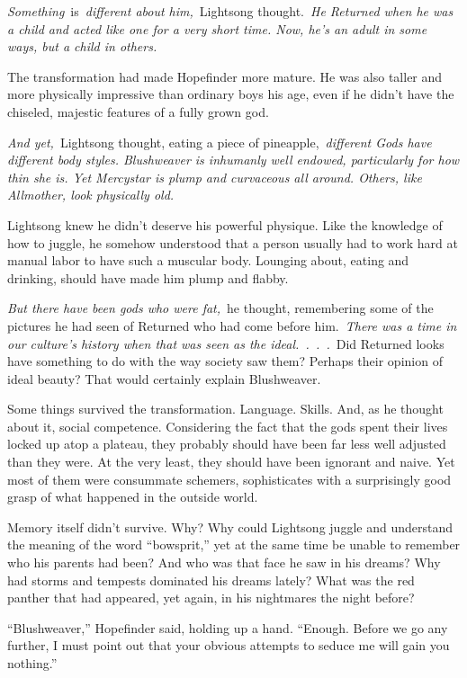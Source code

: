 \textit{Something}~is~\textit{different about him,}~Lightsong thought.~\textit{He Returned when he was a child and acted like one for a very short time. Now, he’s an adult in some ways, but a child in others.}

The transformation had made Hopefinder more mature. He was also taller and more physically impressive than ordinary boys his age, even if he didn’t have the chiseled, majestic features of a fully grown god.

\textit{And yet,}~Lightsong thought, eating a piece of pineapple,~\textit{different Gods have different body styles. Blushweaver is inhumanly well endowed, particularly for how thin she is. Yet Mercystar is plump and curvaceous all around. Others, like Allmother, look physically old.}

Lightsong knew he didn’t deserve his powerful physique. Like the knowledge of how to juggle, he somehow understood that a person usually had to work hard at manual labor to have such a muscular body. Lounging about, eating and drinking, should have made him plump and flabby.

\textit{But there have been gods who were fat,}~he thought, remembering some of the pictures he had seen of Returned who had come before him.~\textit{There was a time in our culture’s history when that was seen as the ideal.~.~.~.}~Did Returned looks have something to do with the way society saw them? Perhaps their opinion of ideal beauty? That would certainly explain Blushweaver.

Some things survived the transformation. Language. Skills. And, as he thought about it, social competence. Considering the fact that the gods spent their lives locked up atop a plateau, they probably should have been far less well adjusted than they were. At the very least, they should have been ignorant and naive. Yet most of them were consummate schemers, sophisticates with a surprisingly good grasp of what happened in the outside world.

Memory itself didn’t survive. Why? Why could Lightsong juggle and understand the meaning of the word “bowsprit,” yet at the same time be unable to remember who his parents had been? And who was that face he saw in his dreams? Why had storms and tempests dominated his dreams lately? What was the red panther that had appeared, yet again, in his nightmares the night before?

“Blushweaver,” Hopefinder said, holding up a hand. “Enough. Before we go any further, I must point out that your obvious attempts to seduce me will gain you nothing.”

